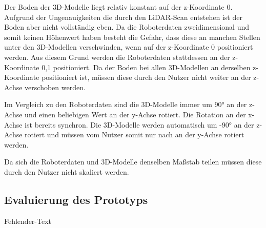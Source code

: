 Der Boden der 3D-Modelle liegt relativ konstant auf der z-Koordinate 0. Aufgrund der Ungenauigkeiten die durch den \ac{LiDAR}-Scan entstehen ist der Boden aber nicht vollständig eben. Da die Roboterdaten zweidimensional und somit keinen Höhenwert haben besteht die Gefahr, dass diese an manchen Stellen unter den 3D-Modellen verschwinden, wenn auf der z-Koordinate 0 positioniert werden. Aus diesem Grund werden die Roboterdaten stattdessen an der z-Koordinate 0,1 positioniert. Da der Boden bei allen 3D-Modellen an derselben z-Koordinate positioniert ist, müssen diese durch den Nutzer nicht weiter an der z-Achse verschoben werden.

Im Vergleich zu den Roboterdaten sind die 3D-Modelle immer um 90° an der z-Achse und einen beliebigen Wert an der y-Achse rotiert. Die Rotation an der x-Achse ist bereits synchron. Die 3D-Modelle werden automatisch um -90° an der z-Achse rotiert und müssen vom Nutzer somit nur nach an der y-Achse rotiert werden.

Da sich die Roboterdaten und 3D-Modelle denselben Maßstab teilen müssen diese durch den Nutzer nicht skaliert werden.

\newpage
\subsection{Evaluierung des Prototyps}
Fehlender-Text